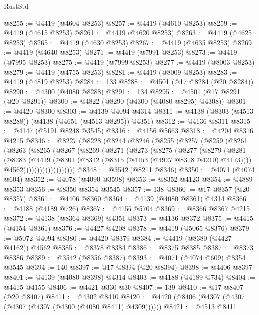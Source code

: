 \begin{lexlean}{RustStd}
\begin{coremodule}
@8255 := @4419 (@4604 @8253)
@8257 := @4419 (@4610 @8253)
@8259 := @4419 (@4615 @8253)
@8261 := @4419 (@4620 @8253)
@8263 := @4419 (@4625 @8253)
@8265 := @4419 (@4630 @8253)
@8267 := @4419 (@4635 @8253)
@8269 := @4419 (@4640 @8253)
@8271 := @4419 (@7991 @8253)
@8273 := @4419 (@7995 @8253)
@8275 := @4419 (@7999 @8253)
@8277 := @4419 (@8003 @8253)
@8279 := @4419 (@4755 @8253)
@8281 := @4419 (@8009 @8253)
@8283 := @4419 (@4819 @8253)
@8284 := 133
@8288 := @4501 (@17 @8284 (@20 @8284))
@8290 := @4300 (@4080 @8288)
@8291 := 134
@8295 := @4501 (@17 @8291 (@20 @8291))
@8300 := @4822 (@8290 (@4300 (@4080 @8295) @4308))
@8301 := @4420 @8300
@8303 := @4139 @4094 @4314
@8311 := @4138 (@8303 (@4513 @8288)) (@4138 (@4651 (@4513 @8295)) @4351)
@8312 := @4136 @8311
@8315 := @4147 (@5191 @8248 @3545)
@8316 := @4156 @5663
@8318 := @4204 @8316 @4215
@8346 := @8227
    (@8228
      (@8244
        (@8246
          (@8255
            (@8257
              (@8259
                (@8261
                  (@8263
                    (@8265
                      (@8267
                        (@8269
                          (@8271
                            (@8273
                              (@8275
                                (@8277
                                  (@8279
                                    (@8281
                                      (@8283
                                        (@4419
                                          (@8301 (@8312 (@8315 (@4153 (@4927 @8318 @4210) @4173))))
                                          @4562)))))))))))))))))))
@8348 := @3542 (@8211 @8346)
@8350 := @4071 (@4074 @604)
@8352 := @4078 (@4090 @3598)
@8353 := @8352 @4123
@8354 := @4889 @8353
@8356 := @8350 @8354 @3545
@8357 := 138
@8360 := @17 @8357 (@20 @8357)
@8361 := @4406 @8360
@8364 := @4139 (@4080 @8361) @4314
@8366 := @4188 (@4189 @726)
@8367 := @4156 @5704
@8369 := @8366 @8367 @4215
@8372 := @4138 (@8364 @8369) @4351
@8373 := @4136 @8372
@8375 := @4415 (@4154 @8361)
@8376 := @4427 @4208
@8378 := @4419 (@5065 @8376)
@8379 := @5072 @4094
@8380 := @4420 @8379
@8384 := @4419 (@8380 (@4427 @4162)) @4562
@8385 := @8378 @8384
@8386 := @8375 @8385
@8387 := @8373 @8386
@8389 := @3542 (@8356 @8387)
@8393 := @4071 (@4074 @609) @8354 @3545
@8394 := 140
@8397 := @17 @8394 (@20 @8394)
@8398 := @4406 @8397
@8401 := @4139 (@4080 @8398) @4314
@8403 := @4188 (@4189 @734)
@8404 := @4415 @4155
@8406 := @4421 @330 @30
@8407 := 139
@8410 := @17 @8407 (@20 @8407)
@8411 := @4302 @8410
@8420 := @4420 (@8406 (@4307 (@4307 (@4307 (@4307 (@4300 (@4080 @8411) @4309))))))
@8421 := @4513 @8411

\end{coremodule}
\end{lexlean}
